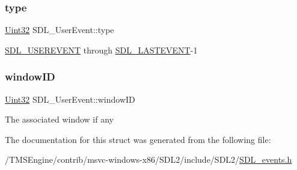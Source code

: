 \subsubsection{\texorpdfstring{type}{type}}
{\footnotesize\ttfamily \hyperlink{_s_d_l__stdinc_8h_add440eff171ea5f55cb00c4a9ab8672d}{Uint32} S\+D\+L\+\_\+\+User\+Event\+::type}

\hyperlink{_s_d_l__events_8h_a3b589e89be6b35c02e0dd34a55f3fccaa4364c23f54802309e83fdb9b1c07c719}{S\+D\+L\+\_\+\+U\+S\+E\+R\+E\+V\+E\+NT} through \hyperlink{_s_d_l__events_8h_a3b589e89be6b35c02e0dd34a55f3fccaaffeac40a4ff366717c0ebc74118ea2ae}{S\+D\+L\+\_\+\+L\+A\+S\+T\+E\+V\+E\+NT}-\/1 \mbox{\label{struct_s_d_l___user_event_abccefa10e0e0e3a0801bc6d836a08da7}} 
\subsubsection{\texorpdfstring{window\+ID}{windowID}}
{\footnotesize\ttfamily \hyperlink{_s_d_l__stdinc_8h_add440eff171ea5f55cb00c4a9ab8672d}{Uint32} S\+D\+L\+\_\+\+User\+Event\+::window\+ID}

The associated window if any 

The documentation for this struct was generated from the following file\+:\begin{DoxyCompactItemize}
\item 
/\+T\+M\+S\+Engine/contrib/msvc-\/windows-\/x86/\+S\+D\+L2/include/\+S\+D\+L2/\hyperlink{_s_d_l__events_8h}{S\+D\+L\+\_\+events.\+h}\end{DoxyCompactItemize}
